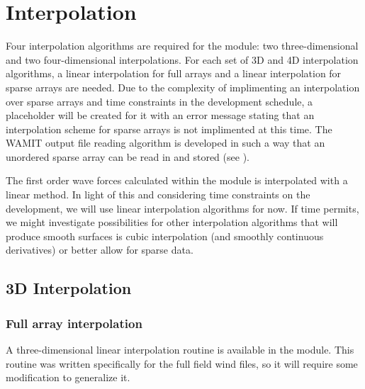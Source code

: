 \section{Interpolation}
\label{sec:Algorithm:Interp}
Four interpolation algorithms are required for the  module: two three-dimensional and two four-dimensional interpolations.
For each set of 3D and 4D interpolation algorithms, a linear interpolation for full arrays and a linear interpolation for sparse arrays are needed.  Due to the complexity of implimenting an interpolation over sparse arrays and time constraints in the development schedule, a placeholder will be created for it with an error message stating that an interpolation scheme for sparse arrays is not implimented at this time.  The WAMIT output file reading algorithm is developed in such a way that an unordered sparse array can be read in and stored (see ).

The first order wave forces calculated within the  module is interpolated with a linear method.  In light of this and considering time constraints on the development, we will use linear interpolation algorithms for now.  If time permits, we might investigate possibilities for other interpolation algorithms that will produce smooth surfaces is cubic interpolation (and smoothly continuous derivatives) or better allow for sparse data.  

\subsection{3D Interpolation}
\label{sec:interp:3d}
\subsubsection{Full array interpolation}
A three-dimensional linear interpolation routine is available in the  module.  This routine was written specifically for the full field wind files, so it will require some modification to generalize it.

